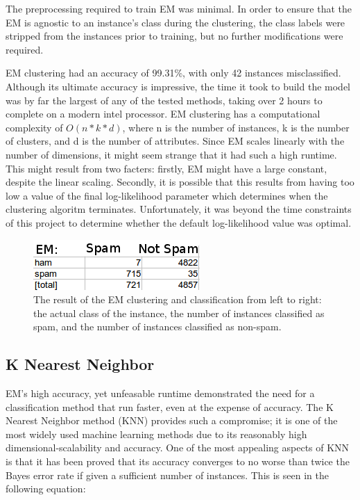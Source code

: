 \documentclass[letterpaper, 10 pt, conference]{ieeeconf}  %
\begin{document}
The preprocessing required to train EM was minimal. In order to ensure
that the EM is agnostic to an instance's class during the clustering,
the class labels were stripped from the instances prior to training,
but no further modifications were required.

EM clustering had an accuracy of 99.31\%, with only 42 instances
misclassified. Although its ultimate accuracy is impressive, the time
it took to build the model was by far the largest of any of the tested
methods, taking over 2 hours to complete on a modern intel
processor. EM clustering has a computational complexity of $O(n*k*d)$,
where n is the number of instances, k is the number of clusters, and d
is the number of attributes. Since EM scales linearly with the number
of dimensions, it might seem strange that it had such a high
runtime. This might result from two facters: firstly, EM might have a
large constant, despite the linear scaling. Secondly, it is possible
that this results from having too low a value of the final
log-likelihood parameter which determines when the clustering algoritm
terminates. Unfortunately, it was beyond the time constraints of this
project to determine whether the default log-likelihood value was
optimal.

\begin{figure}[t]
\centering
\includegraphics[width=0.93\columnwidth]{figures/EM.png}
\caption{ The result of the EM clustering and classification from left
  to right: the actual class of the instance, the number of instances
  classified as spam, and the number of instances classified as
  non-spam.  }
\label{fig-3}
\end{figure}


\subsection{K Nearest Neighbor}
EM's high accuracy, yet unfeasable runtime demonstrated the need for a
classification method that run faster, even at the expense of
accuracy. The K Nearest Neighbor method (KNN) provides such a
compromise; it is one of the most widely used machine learning methods
due to its reasonably high dimensional-scalability and accuracy. One
of the most appealing aspects of KNN is that it has been proved that
its accuracy converges to no worse than twice the Bayes error rate if
given a sufficient number of instances. This is seen in the following
equation:
\end{document}
